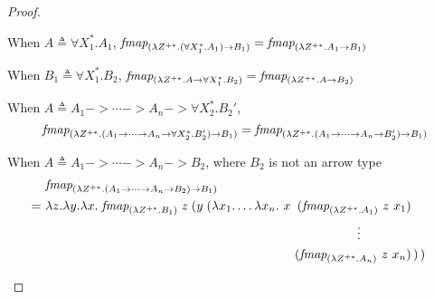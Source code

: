 \begin{proof}
\begin{itemize}
        When $A \triangleq \forall X_1^{*}.A_1$,
        $\textit{fmap}_{(\lambda Z^{+*}.(\forall X_1^{*}.A_1) -> B_1)}
        = \textit{fmap}_{(\lambda Z^{+*}.A_1 -> B_1)}$
        
        When $B_1 \triangleq \forall X_1^{*}.B_2$,
        $\textit{fmap}_{(\lambda Z^{+*}.A -> \forall X_1^{*}.B_2)}
        = \textit{fmap}_{(\lambda Z^{+*}.A -> B_2)}$        

        \begin{singlespace}
        When $A \triangleq A_1 -> \cdots -> A_n -> \forall X_2^{*}.B_2'$,
        \vspace{-1.5ex}
        \[\textit{fmap}_{(\lambda Z^{+*}.(A_1 -> \cdots -> A_n -> \forall X_2^{*}.B_2') -> B_1)}
        = \textit{fmap}_{(\lambda Z^{+*}.(A_1 -> \cdots -> A_n -> B_2') -> B_1)} \]

        When $A \triangleq A_1 -> \cdots -> A_n -> B_2$,
        where $B_2$ is not an arrow type
        \vspace{-1.5ex}
        \begin{align*}
          & \textit{fmap}_{(\l Z^{+*}.(A_1 -> \cdots -> A_n -> B_2) -> B_1)} \\
        =~& \l z.\l y. \l x.\;
        \textit{fmap}_{(\l Z^{+*}.B_1)} \; z \;
                (y \; (\l x_1.\ldots\l x_n. ~
                   x  &\!\!\!\!(\textit{fmap}_{(\l Z^{+*}.A_1)} ~ z ~ x_1)& \\
                     &&\!\!\!\!\vdots \qquad\qquad& \\
                     &&\!\!\!\!(\textit{fmap}_{(\l Z^{+*}.A_n)} ~ z ~ x_n)&
                \,) \,)
        \end{align*}
	\end{singlespace}\vspace*{-4ex}
\end{itemize}
\end{proof}

